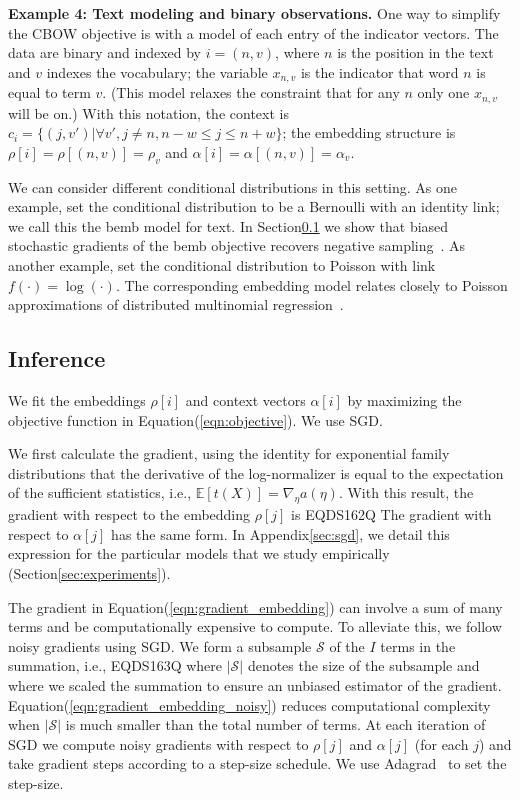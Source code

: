 \documentclass[12pt]{article}
\DeclareRobustCommand{\parhead}[1]{\vspace{0.05in} \textbf{#1} }
\begin{document}
\parhead{Example 4: Text modeling and binary observations.}
One way to simplify the \gls{CBOW} objective is with a model of each
entry of the indicator vectors. The data are binary and indexed by
$i=(n,v)$, where $n$ is the position in the text and $v$ indexes the
vocabulary; the variable $x_{n,v}$ is the indicator that word $n$ is
equal to term $v$.  (This model relaxes the constraint that for any
$n$ only one $x_{n,v}$ will be on.)  With this notation, the context
is $c_i = \{(j,v')| \forall v', j\neq n, n-w \leq j \leq n+w \}$; the
embedding structure is $\rho[i] = \rho[(n,v)] = \rho_v$ and
$\alpha[i] = \alpha[(n,v)] =\alpha_v$.

We can consider different conditional distributions in this setting.
As one example, set the conditional distribution to be a Bernoulli
with an identity link; we call this the \gls{bemb} model for text. In
Section\nobreakspace \ref {sec:inference} we show that biased stochastic gradients of the
\gls{bemb} objective recovers negative
sampling~\citep{mikolov2013distributed}. As another example, set the
conditional distribution to Poisson with link $f(\cdot)=\log(\cdot)$.
The corresponding embedding model relates closely to Poisson
approximations of distributed multinomial
regression~\citep{taddy2015distributed}.

\subsection{Inference}
\label{sec:inference}

We fit the embeddings $\rho[i]$ and context vectors $\alpha[i]$ by
maximizing the objective function in Equation\nobreakspace \textup {(\ref {eqn:objective})}.  We use
\gls{SGD}.

We first calculate the gradient, using the identity for exponential
family distributions that the derivative of the log-normalizer is
equal to the expectation of the sufficient statistics, i.e.,
$\mathbb{E}[t(X)] = \nabla_{\eta} a(\eta)$.  With this result, the
gradient with respect to the embedding $\rho[j]$ is
EQDS162Q
The gradient with respect to $\alpha[j]$ has the same form.  In
Appendix\nobreakspace \ref {sec:sgd}, we detail this expression for the particular models
that we study empirically (Section\nobreakspace \ref {sec:experiments}).

The gradient in Equation\nobreakspace \textup {(\ref {eqn:gradient_embedding})} can involve a sum of
many terms and be computationally expensive to compute. To alleviate
this, we follow noisy gradients using \gls{SGD}.  We form a subsample
$\mathcal{S}$ of the $I$ terms in the summation, i.e.,
EQDS163Q
where $|\mathcal{S}|$ denotes the size of the subsample and where we scaled the summation to ensure an unbiased estimator of the gradient.
Equation\nobreakspace \textup {(\ref {eqn:gradient_embedding_noisy})} reduces computational complexity
when $|\mathcal{S}|$ is much smaller than the total number of terms.
At each iteration of \gls{SGD} we compute noisy gradients with respect
to $\rho[j]$ and $\alpha[j]$ (for each $j$) and take gradient steps
according to a step-size schedule.  We use Adagrad~\citep{Duchi2011}
to set the step-size.
\end{document}
